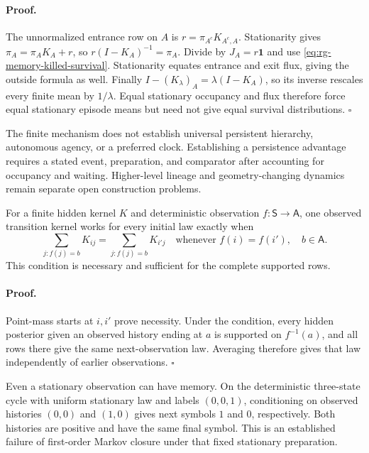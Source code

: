 \paragraph{Proof.}
The unnormalized entrance row on \(A\) is
\(r=\pi_{A^c}K_{A^c,A}\). Stationarity gives
\(\pi_A=\pi_AK_A+r\), so
\(r(I-K_A)^{-1}=\pi_A\). Divide by \(J_A=r\mathbf1\) and use
\cref{eq:rg-memory-killed-survival}. Stationarity equates entrance and
exit flux, giving the outside formula as well. Finally
\(I-(K_\lambda)_A=\lambda(I-K_A)\), so its inverse rescales every
finite mean by \(1/\lambda\). Equal stationary occupancy and flux
therefore force equal stationary episode means but need not give equal
survival distributions. \(\square\)

The finite mechanism does not establish universal persistent hierarchy,
autonomous agency, or a preferred clock. Establishing a persistence advantage
requires a stated event, preparation, and comparator after accounting for
occupancy and waiting. Higher-level lineage and geometry-changing dynamics
remain separate open construction problems. 

For a finite hidden kernel \(K\) and deterministic observation
\(f:\mathsf S\to\mathsf A\), one observed transition kernel works for
every initial law exactly when
\begin{equation}
 \sum_{j:f(j)=b}K_{ij}
 =\sum_{j:f(j)=b}K_{i'j}
 \quad\text{whenever }f(i)=f(i'),\quad b\in\mathsf A.
\label{eq:rg-memory-lumpability}
\end{equation}
This condition is necessary and sufficient for the complete supported rows. 

\paragraph{Proof.}
Point-mass starts at \(i,i'\) prove necessity. Under the condition, every
hidden posterior given an observed history ending at \(a\) is supported on
\(f^{-1}(a)\), and all rows there give the same next-observation law.
Averaging therefore gives that law independently of earlier observations.
\(\square\)

Even a stationary observation can have memory. On the deterministic
three-state cycle with uniform stationary law and labels \((0,0,1)\),
conditioning on observed histories \((0,0)\) and \((1,0)\) gives next
symbols \(1\) and \(0\), respectively. Both histories are positive and
have the same final symbol. This is an established failure of first-order
Markov closure under that fixed stationary preparation.

